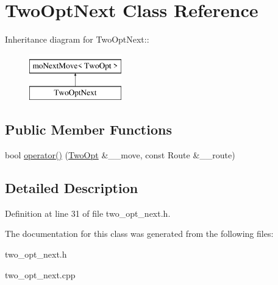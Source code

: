 \hypertarget{classTwoOptNext}{
\section{Two\-Opt\-Next Class Reference}
\label{classTwoOptNext}
}
Inheritance diagram for Two\-Opt\-Next::\begin{figure}[H]
\begin{center}
\leavevmode
\includegraphics[height=2cm]{classTwoOptNext}
\end{center}
\end{figure}
\subsection*{Public Member Functions}
\begin{CompactItemize}
\item 
\hypertarget{classTwoOptNext_baf229b2e056f39ab971cf2ac66a833e}{
bool \hyperlink{classTwoOptNext_baf229b2e056f39ab971cf2ac66a833e}{operator()} (\hyperlink{classTwoOpt}{Two\-Opt} \&\_\-\_\-move, const Route \&\_\-\_\-route)}
\label{classTwoOptNext_baf229b2e056f39ab971cf2ac66a833e}

\end{CompactItemize}


\subsection{Detailed Description}




Definition at line 31 of file two\_\-opt\_\-next.h.

The documentation for this class was generated from the following files:\begin{CompactItemize}
\item 
two\_\-opt\_\-next.h\item 
two\_\-opt\_\-next.cpp\end{CompactItemize}
